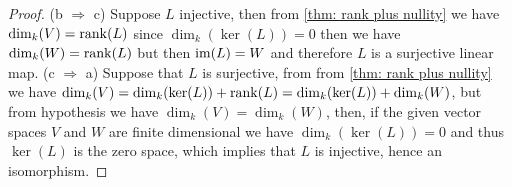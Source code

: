 \begin{proof}
    (b \(\Rightarrow\) c) Suppose \(L\) injective, then from \cref{thm: rank plus
        nullity} we have \(\dim_k(V) = \operatorname{rank}(L)\) since \(\dim_k(\ker(L)) = 0\) then
    we have \(\dim_k(W) = \operatorname{rank}(L)\) but then \(\operatorname{im}(L) = W\) and therefore \(L\)
    is a surjective linear map. (c \(\Rightarrow\) a) Suppose that \(L\) is
    surjective, from from \cref{thm: rank plus nullity} we have \(\dim_k(V) =
    \dim_k(\ker(L)) + \operatorname{rank}(L) = \dim_k(\ker(L)) + \dim_k(W)\), but from
    hypothesis we have \(\dim_k(V) = \dim_k(W)\), then, if the given vector spaces
    \(V\) and \(W\) are finite dimensional we have \(\dim_k(\ker(L)) = 0\) and
    thus \(\ker(L)\) is the zero space, which implies that \(L\) is injective,
    hence an isomorphism.
\end{proof}
